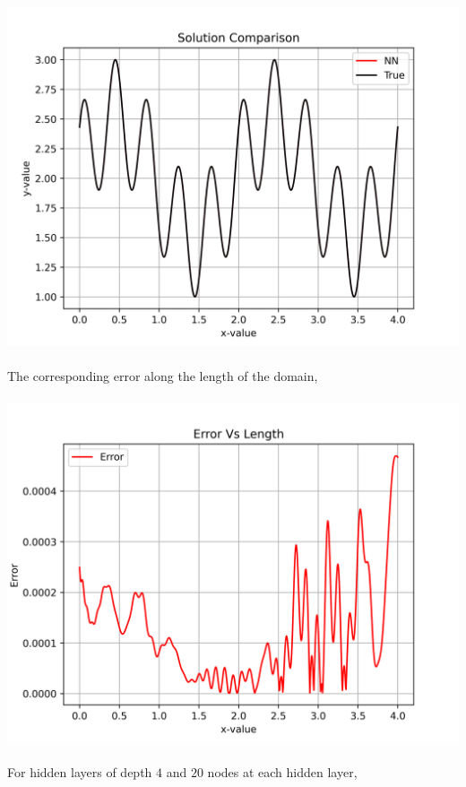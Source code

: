 \documentclass[a4paper, 12pt]{report}
\def\size{0.92}
\begin{document}
\begin{center}
\\~\\\includegraphics[scale=\size]{breadthsol40.png}
\\~\\The corresponding error along the length of the domain,
\\~\\\includegraphics[scale=\size]{breadtherr40.png}
\\~\\For hidden layers of depth $4$ and $20$ nodes at each hidden layer,

\end{center}
\end{document}
